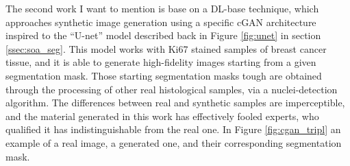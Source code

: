 The second work I want to mention is base on a DL-base technique, which approaches synthetic image generation using a specific cGAN architecture inspired to the ``U-net'' \cite{Senaras2018} model described back in Figure \ref{fig:unet} in section \ref{ssec:soa_seg}.
This model works with Ki67 stained samples of breast cancer tissue, and it is able to generate high-fidelity images starting from a given segmentation mask. Those starting segmentation masks tough are obtained through the processing of other real histological samples, via a nuclei-detection algorithm. The differences between real and synthetic samples are imperceptible, and the material generated in this work has effectively fooled experts, who qualified it has indistinguishable from the real one. In Figure \ref{fig:cgan_tripl} an example of a real image, a generated one, and their corresponding segmentation mask.

